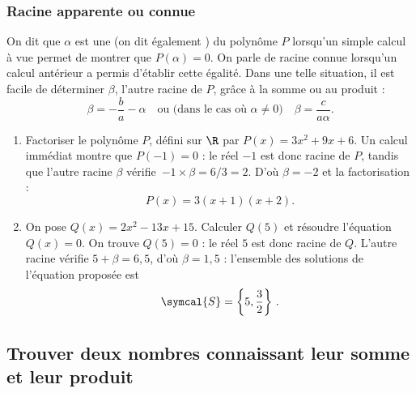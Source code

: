 \subsubsection{Racine apparente ou connue}
On dit que $\alpha$ est une  (on dit également ) du polynôme $P$ lorsqu'un simple calcul à vue permet de montrer que $P(\alpha)=0$. On parle de racine connue lorsqu'un calcul antérieur a permis d'établir cette égalité. Dans une telle situation, il est facile de déterminer $\beta$, l'autre racine de $P$, grâce à la somme ou au produit :
\[
 \beta=-\frac{b}{a}-\alpha \quad \text{ou (dans le cas où $\alpha\neq0$)}\quad\beta=\frac{c}{a\alpha}.
\]
\begin{example}[Exemples]
\begin{enumerate}
\item Factoriser le polynôme $P$, défini sur $\R$ par $P(x)=3x^2+9x+6$. Un calcul immédiat montre que $P(-1)=0$ : le réel $-1$ est donc racine de $P$, tandis que l'autre racine $\beta$ vérifie~\mbox{$-1\times\beta=6/3=2$}. D'où $\beta=-2$ et la factorisation : \[P(x)=3(x+1)(x+2).\]
\item On pose $Q(x)=2x^2-13x+15$. Calculer $Q(5)$ et résoudre l'équation $Q(x)=0$. On trouve $Q(5)=0$ : le réel $5$ est donc racine de $Q$. L'autre racine vérifie $5+\beta=6{,}5$, d'où $\beta=1{,}5$ : l'ensemble des solutions de l'équation proposée est \[\symcal{S}=\left\{5, \frac32\right\}\,.\]

\end{enumerate}
\end{example}

\subsection{Trouver deux nombres connaissant leur somme et leur produit}

